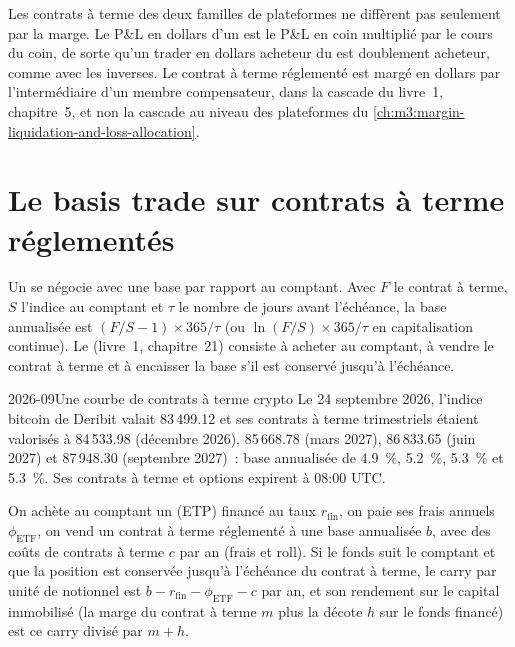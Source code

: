 Les contrats à terme des deux familles de plateformes ne diffèrent pas seulement par la marge. Le P\&L en dollars d'un  est le
P\&L en coin multiplié par le cours du coin, de sorte qu'un trader en dollars acheteur du  est doublement acheteur, comme
avec les  inverses. Le contrat à terme réglementé est margé en dollars par l'intermédiaire d'un membre compensateur, dans la
cascade du livre~1, chapitre~5, et non la cascade au niveau des plateformes du \cref{ch:m3:margin-liquidation-and-loss-allocation}.

\section{Le basis trade sur contrats à terme réglementés}

Un  se négocie avec une base par rapport au comptant. Avec $F$ le contrat à terme, $S$ l'indice au comptant et $\tau$ le nombre de jours avant l'échéance, la
base annualisée est $(F/S - 1)\times 365/\tau$ (ou $\ln(F/S)\times 365/\tau$ en capitalisation continue). Le 
(livre~1, chapitre~21) consiste à acheter au comptant, à vendre le contrat à terme et à encaisser la base s'il est conservé jusqu'à l'échéance.

\begin{dated}{2026-09}{Une courbe de contrats à terme crypto}\label{dat:m3:dated-futures-options-and-etfs:curve}
Le 24 septembre 2026, l'indice bitcoin de Deribit valait 83\,499.12 et ses contrats à terme trimestriels étaient valorisés à 84\,533.98
(décembre 2026), 85\,668.78 (mars 2027), 86\,833.65 (juin 2027) et 87\,948.30 (septembre 2027)~: base annualisée de
4.9~\%, 5.2~\%, 5.3~\% et 5.3~\%. Ses contrats à terme et options expirent à 08:00 UTC.
\end{dated}

\begin{proposition}\label{prop:m3:dated-futures-options-and-etfs:carry}
On achète au comptant un  (ETP) financé au taux $r_{\mathrm{fin}}$, on paie ses frais annuels $\phi_{\mathrm{ETF}}$,
on vend un contrat à terme réglementé à une base annualisée $b$, avec des coûts de contrats à terme $c$ par an (frais et roll). Si le fonds
suit le comptant et que la position est conservée jusqu'à l'échéance du contrat à terme, le carry par unité de notionnel est
$b - r_{\mathrm{fin}} - \phi_{\mathrm{ETF}} - c$ par an, et son rendement sur le capital immobilisé (la marge du contrat à terme $m$ plus
la décote $h$ sur le fonds financé) est ce carry divisé par $m + h$.
\end{proposition}

